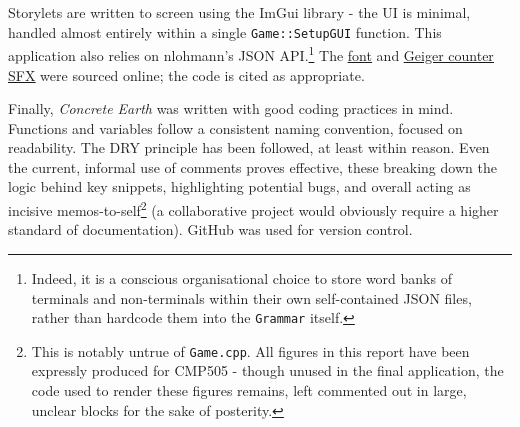 \documentclass[a4paper, 11pt]{article}
\begin{document}
\begin{flushleft}
\vspace{5pt}\noindent
Storylets are written to screen using the ImGui library - the UI is minimal, handled almost entirely within a single \texttt{Game::SetupGUI} function. This application also relies on nlohmann's JSON API.\footnote{Indeed, it is a conscious organisational choice to store word banks of terminals and non-terminals within their own self-contained JSON files, rather than hardcode them into the \texttt{Grammar} itself.} The \href{https://www.dafont.com/benegraphic.font}{\ul{font}} and \href{https://freesound.org/people/JustLaz/sounds/616516/}{\ul{Geiger counter SFX}} were sourced online; the code is cited as appropriate.

\vspace{5pt}\noindent
Finally, \textit{Concrete Earth} was written with good coding practices in mind. Functions and variables follow a consistent naming convention, focused on readability. The DRY principle has been followed, at least within reason. Even the current, informal use of comments proves effective, these breaking down the logic behind key snippets, highlighting potential bugs, and overall acting as incisive memos-to-self\footnote{This is notably untrue of \texttt{Game.cpp}. All figures in this report have been expressly produced for CMP505 - though unused in the final application, the code used to render these figures remains, left commented out in large, unclear blocks for the sake of posterity.} (a collaborative project would obviously require a higher standard of documentation). GitHub was used for version control.


\end{flushleft}
\end{document}
